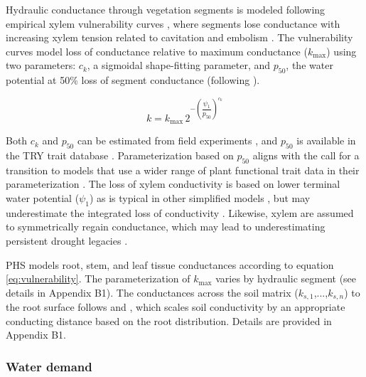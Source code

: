\documentclass[draft,linenumbers]{agujournal}
\begin{document}
     Hydraulic conductance through vegetation segments is modeled following empirical xylem vulnerability curves \citep{tyree1989}, where segments lose conductance with increasing xylem tension related to cavitation and embolism \citep{holbrook2001}.
      The vulnerability curves model loss of conductance relative to maximum conductance ($k_{\text{max}}$) using two parameters: 
      $c_k$, a sigmoidal shape-fitting parameter, and $p_{50}$, the water potential at 50\% loss of segment conductance (following \cite{gentine2016}). 
     
     \begin{linenomath*}
     \begin{equation}
     \label{eq:vulnerability}
     k = k_{\text{max}} \, 2^{-\left(\dfrac{\psi_1}{p_{50}}\right)^{c_k}}
     \end{equation}
     \end{linenomath*}
     
     Both $c_k$ and  $p_{50}$ can be estimated from field experiments \citep{sack2002}, and $p_{50}$ is available in the TRY trait database \citep{kattge2011}. 
     Parameterization based on $p_{50}$ aligns with the call for a transition to models that use a wider range of plant functional trait data in their parameterization \citep{anderegg2015a}. 
     The loss of xylem conductivity is based on lower terminal water potential ($\psi_1$) as is typical in other simplified models \citep{xu2016}, but 
     may underestimate the integrated loss of conductivity \citep{sperry2015}.
     Likewise, xylem are assumed to symmetrically regain conductance, which may lead to underestimating persistent drought legacies \citep{anderegg2015b}.
         
     PHS models root, stem, and leaf tissue conductances according to equation \ref{eq:vulnerability}. 
     The parameterization of $k_{\text{max}}$ varies by hydraulic segment (see details in Appendix B1). 
     The conductances across the soil matrix ($k_{s,1}$,...,$k_{s,n}$) to the root surface follows \citet{williams2001} and \citet{bonan2014}, which scales
     soil conductivity \citep{brooks1964,clapp1978} by an appropriate conducting distance based on the root distribution.
     Details are provided in Appendix B1.
    
    \subsubsection{Water demand}
    \label{sect:demand}
    
\end{document}
